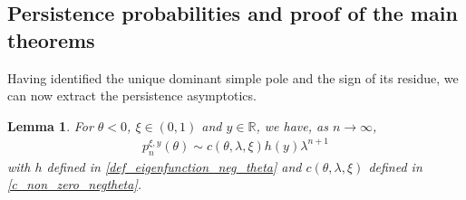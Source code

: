 \documentclass[12pt]{article}
\newcommand{\R}{\mathbb{R}} %
\newcommand{\1}{\mathds{1}}
\theoremstyle{definition}
\theoremstyle{plain}
\newtheorem{Lemma}[definition]{Lemma}
\theoremstyle{remark}
\begin{document}
\subsection{Persistence probabilities and proof of the main theorems}
Having identified the unique dominant simple pole and the sign of its residue, we can now extract the persistence asymptotics.
\begin{Lemma}\label{asymptotic_neg_theta}
  For $\theta<0$,  $\xi\in(0,1)$ and $y\in\R$, we have, as $n\to\infty$,
  \begin{align*}
       p_n^{\xi,y}(\theta)\sim c(\theta,\lambda,\xi)h(y)\lambda^{n+1}
  \end{align*}
  with $h$ defined in \eqref{def_eigenfunction_neg_theta} and $c(\theta,\lambda,\xi)$ defined in \eqref{c_non_zero_negtheta}.
\end{Lemma}
\end{document}
